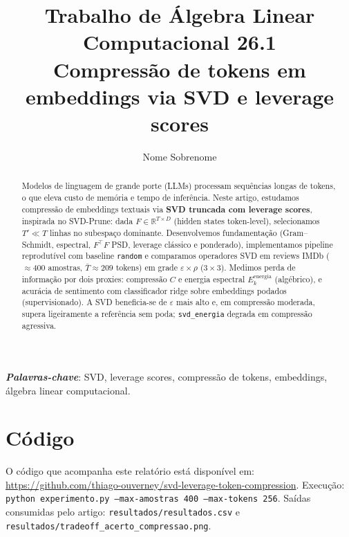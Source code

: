 \documentclass[12pt]{article}
\begin{document}
\title{
Trabalho de Álgebra Linear Computacional \hspace{2.0ex} 26.1\\
Compressão de tokens em embeddings via SVD e leverage scores
}

\author{
    Nome Sobrenome
}

\address{
    Instituto de Computação -- Universidade Federal Fluminense (UFF)\\
    Niterói -- RJ -- Brasil -- 24210-346
}
\maketitle

\begin{abstract}
Modelos de linguagem de grande porte (LLMs) processam sequências longas de tokens, o que eleva custo de memória e tempo de inferência. Neste artigo, estudamos compressão de embeddings textuais via \textbf{SVD truncada com leverage scores}, inspirada no SVD-Prune: dada $F \in \mathbb{R}^{T \times D}$ (hidden states token-level), selecionamos $T' \ll T$ linhas no subespaço dominante. Desenvolvemos fundamentação (Gram--Schmidt, espectral, $F^\top F$ PSD, leverage clássico e ponderado), implementamos pipeline reprodutível com baseline \texttt{random} e comparamos operadores SVD em reviews IMDb ($\approx$400 amostras, $\bar{T}\approx 209$ tokens) em grade $\varepsilon \times \rho$ ($3 \times 3$). Medimos perda de informação por dois proxies: compressão $C$ e energia espectral $E_k^{\mathrm{energia}}$ (algébrico), e acurácia de sentimento com classificador ridge sobre embeddings podados (supervisionado). A SVD beneficia-se de $\varepsilon$ mais alto e, em compressão moderada, supera ligeiramente a referência sem poda; \texttt{svd\_energia} degrada em compressão agressiva.
\end{abstract}

\noindent\textit{\textbf{Palavras-chave}}: SVD, leverage scores, compressão de tokens, embeddings, álgebra linear computacional.







\section*{Código}\label{sec:codigo}
O código que acompanha este relatório está disponível em:
\url{https://github.com/thiago-ouverney/svd-leverage-token-compression}.
Execução: \texttt{python experimento.py --max-amostras 400 --max-tokens 256}.
Saídas consumidas pelo artigo: \texttt{resultados/resultados.csv} e \texttt{resultados/tradeoff\_acerto\_compressao.png}.


\end{document}
